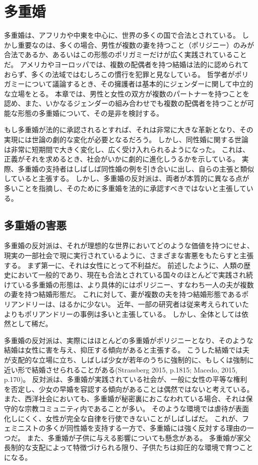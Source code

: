 \documentclass[paper=a4,book,openany]{jlreq}
\begin{document}
\section{多重婚}

多重婚は、アフリカや中東を中心に、世界の多くの国で合法とされている。
しかし重要なのは、多くの場合、男性が複数の妻を持つこと（ポリジニー）のみが合法であるか、あるいはこの形態のポリガミーだけが広く実践されていることだ。
アメリカやヨーロッパでは、複数の配偶者を持つ結婚は法的に認められておらず、多くの法域ではむしろこの慣行を犯罪と見なしている。
哲学者がポリガミーについて議論するとき、その擁護者は基本的にジェンダーに関して中立的な立場をとる。
本章では、男性と女性の双方が複数のパートナーを持つことを認め、また、いかなるジェンダーの組み合わせでも複数の配偶者を持つことが可能な形態の多重婚について、その是非を検討する。

もし多重婚が法的に承認されるとすれば、それは非常に大きな革新となり、その実現には世論の劇的な変化が必要となるだろう。
しかし、同性婚に関する世論は非常に短期間で大きく変化し、広く受け入れられるようになった。
これは、正義がそれを求めるとき、社会がいかに劇的に進化しうるかを示している。
実際、多重婚の支持者はしばしば同性婚の例を引き合いに出し、自らの主張と類似していると主張する。
しかし、多重婚の反対派は、両者が本質的に異なる点が多いことを指摘し、そのために多重婚を法的に承認すべきではないと主張している。

\subsection{多重婚の害悪}

多重婚の反対派は、それが理想的な世界においてどのような価値を持つにせよ、現実の一部社会で現に実行されているように、さまざまな害悪をもたらすと主張する。
まず第一に、それは女性にとって不利益だ。
前述したように、人類の歴史において一般的であり、現在も合法とされている国々のほとんどで実践され続けている多重婚の形態は、より具体的にはポリジニー、すなわち一人の夫が複数の妻を持つ結婚形態だ。
これに対して、妻が複数の夫を持つ結婚形態であるポリアンドリーは、はるかに少ない。
近年、一部の研究者は従来考えられていたよりもポリアンドリーの事例は多いと主張している\citep{starkweather12:_survey_non_class_polyan}。
しかし、全体としては依然として稀だ。

多重婚の反対派は、実際にはほとんどの多重婚がポリジニーとなり、そのような結婚は女性に害を与え、抑圧する傾向があると主張する。
こうした結婚では夫が支配的な立場に立ち、しばしば少女が若年のうちに強制的に、もしくは強制に近い形で結婚させられることがある(Strassberg 2015, p.1815; Macedo, 2015, p.170)。
\nocite{strassberg15:_scrut_polyg}\nocite{macedo15:_just_married}
反対派は、多重婚が実践されている社会が、一般に女性の平等な権利を否定し、少女の早婚を容認する傾向があることは偶然ではないと考えている。
また、西洋社会においても、多重婚が秘密裏におこなわれている場合、それは保守的な宗教コミュニティ内であることが多い。
そのような環境では虐待が表面化しにくく、女性が完全な自律を行使できないことがしばしばだ。
これが、フェミニストの多くが同性婚を支持する一方で、多重婚には強く反対する理由の一つだ。
また、多重婚が子供に与える影響についても懸念がある。
多重婚が家父長制的な支配によって特徴づけられる限り、子供たちは抑圧的な環境で育つことになる。
\end{document}
